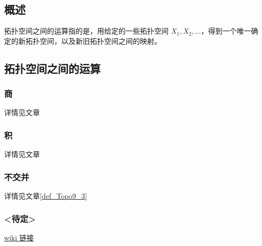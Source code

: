 
\begin{issues}
\issueDraft
\issueTODO
\issueMissDepend
\issueAbstract
\issueNeedCite
\end{issues}

\subsection{概述}

拓扑空间之间的运算指的是，用给定的一些拓扑空间 $X_1, X_2, \dots$，得到一个唯一确定的新拓扑空间，以及新旧拓扑空间之间的映射。


\subsection{拓扑空间之间的运算}

\subsubsection{商}

详情见文章


\subsubsection{积}

详情见文章


\subsubsection{不交并}

详情见文章\autoref{def_Topo9_3}~


\subsubsection{<待定>}

\href{https://en.m.wikipedia.org/wiki/Join_(topology)}{wiki 链接}


